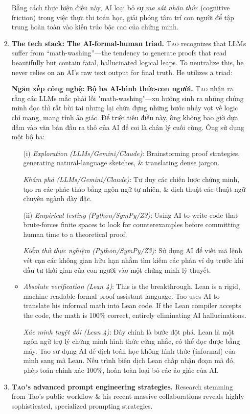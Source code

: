 \documentclass{article}
\begin{document}
\begin{enumerate}
	Bằng cách thực hiện điều này, AI loại bỏ sự \textit{ma sát nhận thức} (cognitive friction) trong việc thực thi toán học, giải phóng tâm trí con người để tập trung hoàn toàn vào kiến trúc bậc cao của chứng minh.
	\item \textbf{The tech stack: The AI-formal-human triad.} \textsc{Tao} recognizes that LLMs suffer from ``math-washing''---the tendency to generate proofs that read beautifully but contain fatal, hallucinated logical leaps. To neutralize this, he never relies on an AI's raw text output for final truth. He utilizes a triad:
	
	\textbf{Ngăn xếp công nghệ: Bộ ba AI-hình thức-con người.} \textsc{Tao} nhận ra rằng các LLMs mắc phải lỗi "math-washing"---xu hướng sinh ra những chứng minh đọc thì rất bùi tai nhưng lại chứa đựng những bước nhảy vọt về logic chí mạng, mang tính ảo giác. Để triệt tiêu điều này, ông không bao giờ dựa dẫm vào văn bản đầu ra thô của AI để coi là chân lý cuối cùng. Ông sử dụng một bộ ba:
	\begin{itemize}
		\item[(i)] \textit{Exploration (LLMs/Gemini/Claude)}: Brainstorming proof strategies, generating natural-language sketches, \& translating dense jargon.
		
		\textit{Khám phá (LLMs/Gemini/Claude)}: Tư duy các chiến lược chứng minh, tạo ra các phác thảo bằng ngôn ngữ tự nhiên, \& dịch thuật các thuật ngữ chuyên ngành dày đặc.
		\item[(ii)] \textit{Empirical testing (Python/SymPy/Z3)}: Using AI to write code that brute-forces finite spaces to look for counterexamples before committing human time to a theoretical proof.
		
		\textit{Kiểm thử thực nghiệm (Python/SymPy/Z3)}: Sử dụng AI để viết mã lệnh vét cạn các không gian hữu hạn nhằm tìm kiếm các phản ví dụ trước khi đầu tư thời gian của con người vào một chứng minh lý thuyết.
		\item \textit{Absolute verification (Lean 4)}: This is the breakthrough. Lean is a rigid, machine-readable formal proof assistant language. \textsf{Tao} uses AI to translate his informal math into Lean code. If the Lean compiler accepts the code, the math is 100\% correct, entirely eliminating AI hallucinations.
		
		\textit{Xác minh tuyệt đối (Lean 4)}: Đây chính là bước đột phá. Lean là một ngôn ngữ trợ lý chứng minh hình thức cứng nhắc, có thể đọc được bằng máy. \textsf{Tao} sử dụng AI để dịch toán học không hình thức (informal) của mình sang mã Lean. Nếu trình biên dịch Lean chấp nhận đoạn mã đó, phép toán chính xác 100\%, hoàn toàn loại bỏ các ảo giác của AI.
	\end{itemize}
	\item \textbf{\textsc{Tao}'s advanced prompt engineering strategies.} Research stemming from {\sc Tao}'s public workflow \& his recent massive collaborations reveals highly sophisticated, specialized prompting strategies.
	

\end{enumerate}
\end{document}
